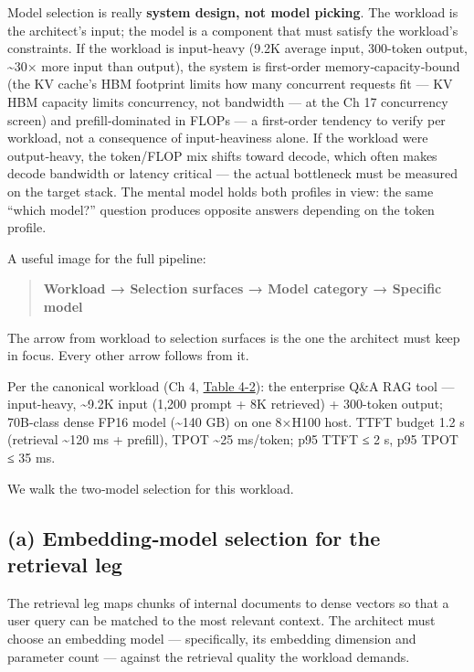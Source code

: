 Model selection is really \textbf{system design, not model picking}. The
workload is the architect's input; the model is a component that must
satisfy the workload's constraints. If the workload is input-heavy (9.2K
average input, 300-token output, \textasciitilde30× more input than
output), the system is first-order memory‑capacity‑bound (the KV cache's
HBM footprint limits how many concurrent requests fit --- KV HBM
capacity limits concurrency, not bandwidth --- at the Ch 17 concurrency
screen) and prefill‑dominated in FLOPs --- a first-order tendency to
verify per workload, not a consequence of input-heaviness alone. If the
workload were output‑heavy, the token/FLOP mix shifts toward decode,
which often makes decode bandwidth or latency critical --- the actual
bottleneck must be measured on the target stack. The mental model holds
both profiles in view: the same ``which model?'' question produces
opposite answers depending on the token profile.

A useful image for the full pipeline:

\begin{quote}
\textbf{Workload → Selection surfaces → Model category → Specific model}
\end{quote}

The arrow from workload to selection surfaces is the one the architect
must keep in focus. Every other arrow follows from it.

\label{worked-example-embeddingmodel-vs-generationmodel-selection-for-the-canonical-rag-workload}


Per the canonical workload (Ch 4, \hyperref[tab:4.2]{Table 4-2}): the enterprise Q\&A RAG
tool --- input-heavy, \textasciitilde9.2K input (1,200 prompt + 8K
retrieved) + 300-token output; 70B-class dense FP16 model
(\textasciitilde140 GB) on one 8×H100 host. TTFT budget 1.2 s (retrieval
\textasciitilde120 ms + prefill), TPOT \textasciitilde25 ms/token; p95
TTFT ≤ 2 s, p95 TPOT ≤ 35 ms.

We walk the two‑model selection for this workload.

\subsection{(a) Embedding‑model selection for the retrieval
leg}\label{a-embeddingmodel-selection-for-the-retrieval-leg}

The retrieval leg maps chunks of internal documents to dense vectors so
that a user query can be matched to the most relevant context. The
architect must choose an embedding model --- specifically, its embedding
dimension and parameter count --- against the retrieval quality the
workload demands.

